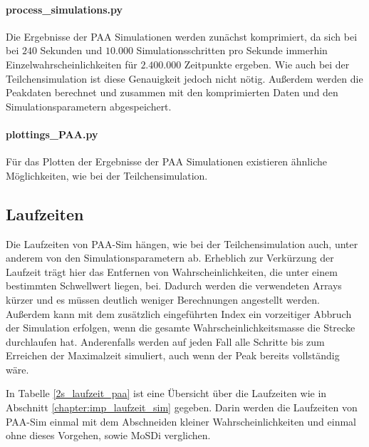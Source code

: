 \paragraph{process\_simulations.py}


Die Ergebnisse der PAA Simulationen werden zunächst komprimiert, da sich bei bei $240$ Sekunden und $10.000$ Simulationsschritten pro Sekunde immerhin Einzelwahrscheinlichkeiten für $2.400.000$ Zeitpunkte ergeben. Wie auch bei der Teilchensimulation ist diese Genauigkeit jedoch nicht nötig. 
Außerdem werden die Peakdaten berechnet und zusammen mit den komprimierten Daten und den Simulationsparametern abgespeichert.


\paragraph{plottings\_PAA.py}
Für das Plotten der Ergebnisse der PAA Simulationen existieren ähnliche Möglichkeiten, wie bei der Teilchensimulation.


\subsection{Laufzeiten}
Die Laufzeiten von PAA-Sim hängen, wie bei der Teilchensimulation auch, unter anderem von den Simulationsparametern ab. Erheblich zur Verkürzung der Laufzeit trägt hier das Entfernen von Wahrscheinlichkeiten, die unter einem bestimmten Schwellwert liegen, bei. Dadurch werden die verwendeten Arrays kürzer und es müssen deutlich weniger Berechnungen angestellt werden. Außerdem kann mit dem zusätzlich eingeführten Index ein vorzeitiger Abbruch der Simulation erfolgen, wenn die gesamte Wahrscheinlichkeitsmasse die Strecke durchlaufen hat. Anderenfalls werden auf jeden Fall alle Schritte bis zum Erreichen der Maximalzeit simuliert, auch wenn der Peak bereits vollständig wäre.

In Tabelle \ref{2s_laufzeit_paa} ist eine Übersicht über die Laufzeiten wie in Abschnitt \ref{chapter:imp_laufzeit_sim} gegeben. Darin werden die Laufzeiten von PAA-Sim einmal mit dem Abschneiden kleiner Wahrscheinlichkeiten und einmal ohne dieses Vorgehen, sowie MoSDi verglichen.

